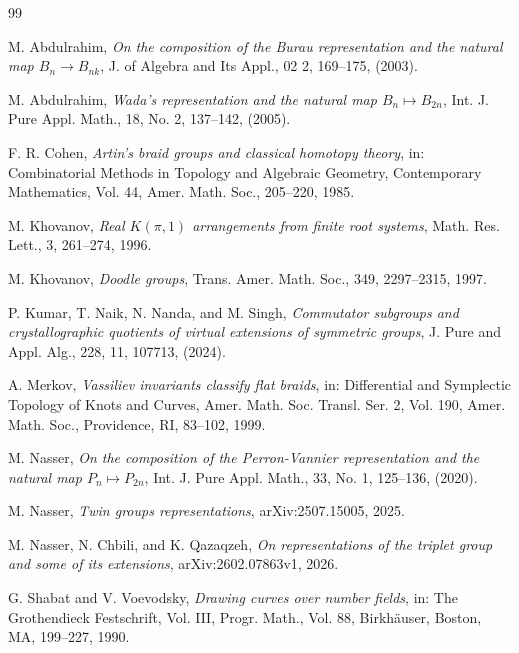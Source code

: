 \documentclass[reqno]{amsart}
\begin{document}
\begin{thebibliography}{99}

 M. Abdulrahim, \emph{On the composition of the Burau representation and the natural map $B_n\rightarrow B_{nk}$}, {J. of Algebra and Its Appl.}, {02} 2, 169--175, (2003).

 M. Abdulrahim, \emph{Wada's representation and the natural map $B_n \mapsto B_{2n}$}, {Int. J. Pure Appl. Math.}, {18}, No. 2, 137--142, (2005).

F. R. Cohen, \emph{Artin’s braid groups and classical homotopy theory}, 
in: Combinatorial Methods in Topology and Algebraic Geometry, 
Contemporary Mathematics, Vol. 44, Amer. Math. Soc., 205--220, 1985.

M. Khovanov, \emph{Real $K(\pi,1)$ arrangements from finite root systems}, 
Math. Res. Lett., 3, 261--274, 1996.

M. Khovanov, \emph{Doodle groups}, 
Trans. Amer. Math. Soc., 349, 2297--2315, 1997.

P. Kumar, T. Naik, N. Nanda, and M. Singh, \emph{Commutator subgroups and crystallographic quotients of virtual extensions of symmetric groups}, {J. Pure and Appl. Alg.}, 228, 11, 107713, (2024).


A. Merkov, \emph{Vassiliev invariants classify flat braids}, 
in: Differential and Symplectic Topology of Knots and Curves, 
Amer. Math. Soc. Transl. Ser. 2, Vol. 190, Amer. Math. Soc., Providence, RI, 83--102, 1999.

 M. Nasser, \emph{On the composition of the Perron-Vannier representation and the natural map $P_n \mapsto P_{2n}$}, {Int. J. Pure Appl. Math.}, {33}, No. 1, 125--136, (2020).

M. Nasser, \emph{Twin groups representations}, 
arXiv:2507.15005, 2025.

M. Nasser, N. Chbili, and K. Qazaqzeh, \emph{On representations of the triplet group and some of its extensions},  arXiv:2602.07863v1, 2026.

G. Shabat and V. Voevodsky, \emph{Drawing curves over number fields}, 
in: The Grothendieck Festschrift, Vol. III, 
Progr. Math., Vol. 88, Birkhäuser, Boston, MA, 199--227, 1990.


\end{thebibliography}
\end{document}
